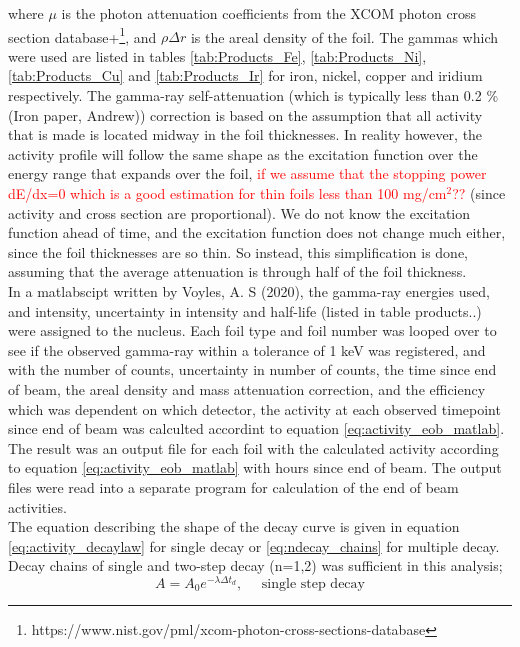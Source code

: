 where $\mu$ is the photon attenuation coefficients from the XCOM photon cross section database+\footnote{https://www.nist.gov/pml/xcom-photon-cross-sections-database}, and $\rho\Delta r$ is the areal density of the foil. The gammas which were used are listed in tables \ref{tab:Products_Fe}, \ref{tab:Products_Ni}, \ref{tab:Products_Cu} and \ref{tab:Products_Ir} for iron, nickel, copper and iridium respectively. The gamma-ray self-attenuation (which is typically less than 0.2 \% (Iron paper, Andrew)) correction is based on the assumption that all activity that is made is located midway in the foil thicknesses. In reality however, the activity profile will follow the same shape as the excitation function over the energy range that expands over the foil, \textcolor{red}{if we assume that the stopping power dE/dx=0 which is a good estimation for thin foils less than 100 mg/cm$^2$??} (since activity and cross section are proportional). We do not know the excitation function ahead of time, and the excitation function does not change much either, since the foil thicknesses are so thin. So instead, this simplification is done, assuming that the average attenuation is through half of the foil thickness. \\ 

In a matlabscipt written by Voyles, A. S (2020), the gamma-ray energies used, and intensity, uncertainty in intensity and half-life (listed in table products..) were assigned to the nucleus. Each foil type and foil number was looped over to see if the observed gamma-ray within a tolerance of 1 keV was registered, and with the number of counts, uncertainty in number of counts, the time since end of beam, the areal density and mass attenuation correction, and the efficiency which was dependent on which detector, the activity at each observed timepoint since end of beam was calculted accordint to equation \ref{eq:activity_eob_matlab}. The result was an output file for each foil with the calculated activity according to equation \ref{eq:activity_eob_matlab} with hours since end of beam. The output files were read into a separate program for calculation of the end of beam activities. \\ %


The equation describing the shape of the decay curve is given in equation \ref{eq:activity_decaylaw} for single decay or \ref{eq:ndecay_chains} for multiple decay. Decay chains of single and two-step decay (n=1,2) was sufficient in this analysis; 
\begin{equation} \label{eq:onestep_activity}
    A = A_0 e^{-\lambda \Delta t_d},\quad \text{ single step decay}
\end{equation}

